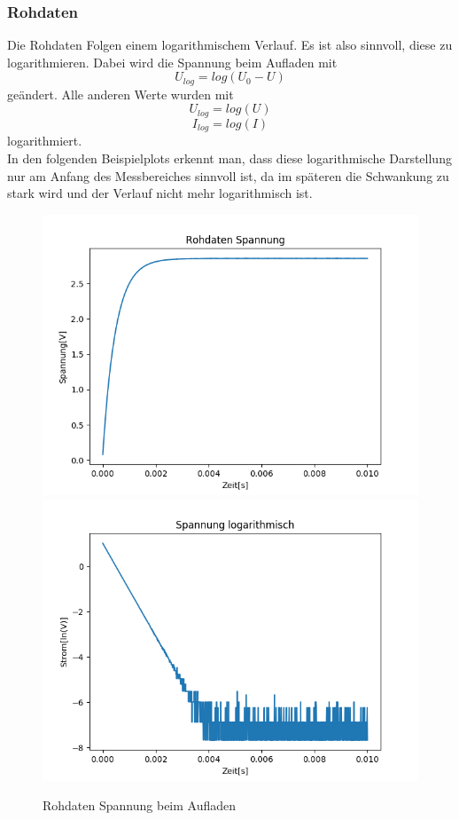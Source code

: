 \documentclass[12pt,a4paper]{article}
\begin{document}
\subsubsection{Rohdaten}
Die Rohdaten Folgen einem logarithmischem Verlauf. Es ist also sinnvoll, diese zu logarithmieren. Dabei wird die Spannung beim Aufladen mit
\begin{equation}
U_{log} = log(U_0-U)
\end{equation}
geändert. Alle anderen Werte wurden mit
\begin{equation}
U_{log} = log(U)
\end{equation}
\begin{equation}
I_{log} = log(I)
\end{equation}
logarithmiert.\\
In den folgenden Beispielplots erkennt man, dass diese logarithmische Darstellung nur am Anfang des Messbereiches sinnvoll ist, da im späteren die Schwankung zu stark wird und der Verlauf nicht mehr logarithmisch ist.
\begin{figure}[H]
\begin{center}
\includegraphics[width=0.49\linewidth]{Bilder/Kondensator_U}
\includegraphics[width=0.49\linewidth]{Bilder/Kondensator_logU}
\caption[Rohdaten logarith. A]{Rohdaten Spannung beim Aufladen}
\label{fig:RohU}
\end{center}
\end{figure}
\end{document}
